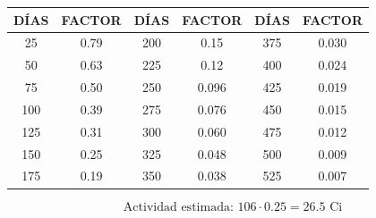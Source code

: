 \begin{center}
\begin{tabular}{|c|c||c|c||c|c|}
\hline
\textbf{DÍAS} & \textbf{FACTOR} & \textbf{DÍAS} & \textbf{FACTOR} & \textbf{DÍAS} & \textbf{FACTOR} \\
\hline
25 & 0.79 & 200 & 0.15 & 375 & 0.030 \\
50 & 0.63 & 225 & 0.12 & 400 & 0.024 \\
75 & 0.50 & 250 & 0.096 & 425 & 0.019 \\
100 & 0.39 & 275 & 0.076 & 450 & 0.015 \\
125 & 0.31 & 300 & 0.060 & 475 & 0.012 \\
150 & 0.25 & 325 & 0.048 & 500 & 0.009 \\
175 & 0.19 & 350 & 0.038 & 525 & 0.007 \\
\hline
\end{tabular}

\[
\text{Actividad estimada: } 106 \cdot 0.25 = 26.5 \text{ Ci}
\]

\end{center}

